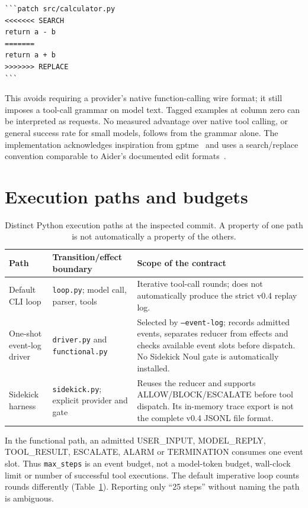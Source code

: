 \documentclass[10pt,twocolumn,letterpaper]{article}
\begin{document}
\begin{lstlisting}
```patch src/calculator.py
<<<<<<< SEARCH
return a - b
=======
return a + b
>>>>>>> REPLACE
```
\end{lstlisting}

This avoids requiring a provider's native function-calling wire format; it still imposes a tool-call grammar on model text. Tagged examples at column zero can be interpreted as requests. No measured advantage over native tool calling, or general success rate for small models, follows from the grammar alone. The implementation acknowledges inspiration from gptme~\cite{gptme} and uses a search/replace convention comparable to Aider's documented edit formats~\cite{aiderformats}.

\section{Execution paths and budgets}
\begin{table}[t]
\centering\small
\begin{tabular}{p{}p{}p{}}
\toprule
Path & Transition/effect boundary & Scope of the contract \\
\midrule
Default CLI loop & \texttt{loop.py}; model call, parser, tools & Iterative tool-call rounds; does not automatically produce the strict v0.4 replay log. \\
One-shot event-log driver & \texttt{driver.py} and \texttt{functional.py} & Selected by \texttt{--event-log}; records admitted events, separates reducer from effects and checks available event slots before dispatch. No Sidekick Noul gate is automatically installed. \\
Sidekick harness & \texttt{sidekick.py}; explicit provider and gate & Reuses the reducer and supports ALLOW/BLOCK/ESCALATE before tool dispatch. Its in-memory trace export is not the complete v0.4 JSONL file format. \\
\bottomrule
\end{tabular}
\caption{Distinct Python execution paths at the inspected commit. A property of one path is not automatically a property of the others.}
\label{tab:paths}
\end{table}

In the functional path, an admitted USER\_INPUT, MODEL\_REPLY, TOOL\_RESULT, ESCALATE, ALARM or TERMINATION consumes one event slot. Thus \texttt{max\_steps} is an event budget, not a model-token budget, wall-clock limit or number of successful tool executions. The default imperative loop counts rounds differently (Table~\ref{tab:paths}). Reporting only ``25 steps'' without naming the path is ambiguous.
\end{document}
